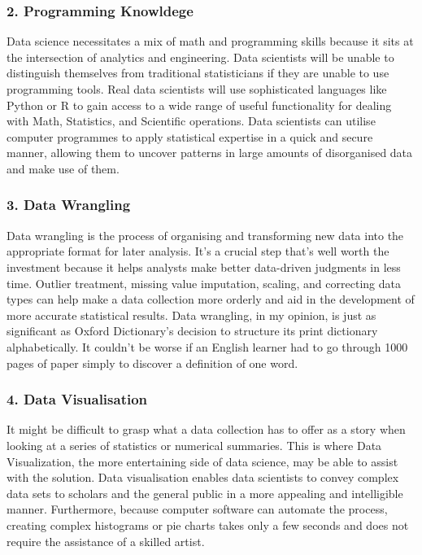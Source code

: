 \documentclass[a4paper, 11pt]{report}
\begin{document}
    \subsubsection{2. Programming Knowldege}
    Data science necessitates a mix of math and programming skills because it sits at the intersection of analytics and engineering. Data scientists will be unable to distinguish themselves from traditional statisticians if they are unable to use programming tools. Real data scientists will use sophisticated languages like Python or R to gain access to a wide range of useful functionality for dealing with Math, Statistics, and Scientific operations.\cite{isaac3} Data scientists can utilise computer programmes to apply statistical expertise in a quick and secure manner, allowing them to uncover patterns in large amounts of disorganised data and make use of them.\cite{isaac1}

    \subsubsection{3. Data Wrangling}
    Data wrangling is the process of organising and transforming new data into the appropriate format for later analysis. It's a crucial step that's well worth the investment because it helps analysts make better data-driven judgments in less time. Outlier treatment, missing value imputation, scaling, and correcting data types can help make a data collection more orderly and aid in the development of more accurate statistical results.\cite{isaac4} Data wrangling, in my opinion, is just as significant as Oxford Dictionary's decision to structure its print dictionary alphabetically. It couldn't be worse if an English learner had to go through 1000 pages of paper simply to discover a definition of one word. 

    \subsubsection{4. Data Visualisation}
    It might be difficult to grasp what a data collection has to offer as a story when looking at a series of statistics or numerical summaries. This is where Data Visualization, the more entertaining side of data science, may be able to assist with the solution. Data visualisation enables data scientists to convey complex data sets to scholars and the general public in a more appealing and intelligible manner.\cite{isaac1} Furthermore, because computer software can automate the process, creating complex histograms or pie charts takes only a few seconds and does not require the assistance of a skilled artist.\cite{isaac1}
\end{document}

